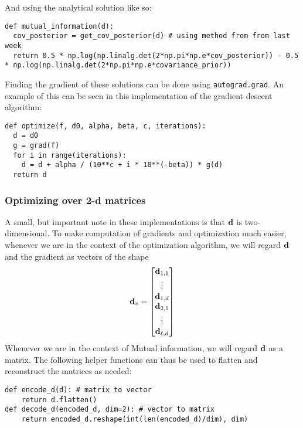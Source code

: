And using the analytical solution like so:
\begin{verbatim}
def mutual_information(d):
  cov_posterior = get_cov_posterior(d) # using method from from last week
  return 0.5 * np.log(np.linalg.det(2*np.pi*np.e*cov_posterior)) - 0.5 * np.log(np.linalg.det(2*np.pi*np.e*covariance_prior))
\end{verbatim}

Finding the gradient of these solutions can be done using \texttt{autograd.grad}. 
An example of this can be seen in this implementation of the gradient descent algorithm:
\begin{verbatim}
def optimize(f, d0, alpha, beta, c, iterations):
  d = d0
  g = grad(f)
  for i in range(iterations):
    d = d + alpha / (10**c + i * 10**(-beta)) * g(d)
  return d
\end{verbatim}

\subsubsection{Optimizing over 2-d matrices}
A small, but important note in these implementations is that $\mathbf{d}$ is two-dimensional.
To make computation of gradients and optimization much easier, whenever we are in the context of the optimization algorithm, we will regard $\mathbf{d}$ and the gradient as vectors of the shape
$$\mathbf{d}_v = \begin{bmatrix}\mathbf{d}_{1,1} \\ \vdots  \\ \mathbf{d}_{1,d} \\ \mathbf{d}_{2,1} \\ \vdots \\ \mathbf{d}_{\ell, d} \end{bmatrix}$$
Whenever we are in the context of Mutual information, we will regard $\mathbf{d}$ as a matrix. The following helper functions can thus be used to flatten and reconstruct the matrices as needed:
\begin{verbatim}
def encode_d(d): # matrix to vector
    return d.flatten()
def decode_d(encoded_d, dim=2): # vector to matrix
    return encoded_d.reshape(int(len(encoded_d)/dim), dim)
\end{verbatim}

